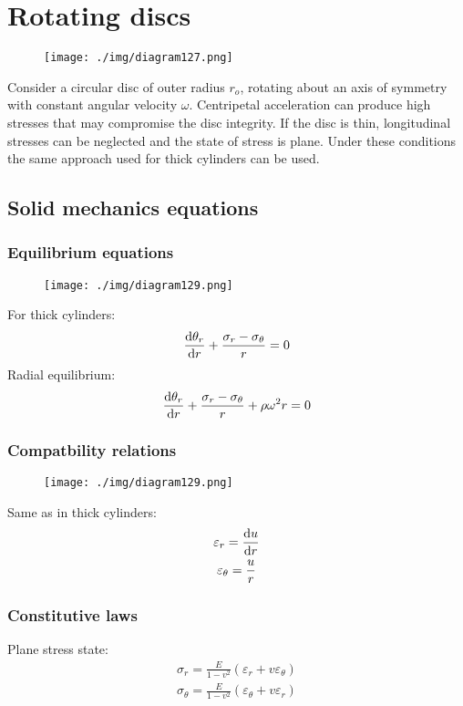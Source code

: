 \section{Rotating discs}
\begin{figure}[H]
    \centering
    \texttt{[image: ./img/diagram127.png]}
    \caption{}
\end{figure}
Consider a circular disc of outer radius $r_{o}$, rotating about an axis of symmetry with constant angular velocity $\omega$. Centripetal acceleration can produce high stresses that may compromise the disc integrity. If the disc is thin, longitudinal stresses can be neglected and the state of stress is plane. Under these conditions the same approach used for thick cylinders can be used.
\subsection{Solid mechanics equations}
\subsubsection{Equilibrium equations}
\begin{figure}[H]
    \centering
    \texttt{[image: ./img/diagram129.png]}
    \caption{}
\end{figure}
For thick cylinders:
\begin{equation}
    \frac{\dif \theta_r}{\dif r} + \frac{\sigma_r - \sigma_{\theta}}{r} =0
\end{equation}
Radial equilibrium:
\begin{equation}
    \frac{\dif \theta_r}{\dif r} + \frac{\sigma_r - \sigma_{\theta}}{r} + \rho \omega^2 r = 0
\end{equation}
\subsubsection{Compatbility relations}
\begin{figure}[H]
    \centering
    \texttt{[image: ./img/diagram129.png]}
    \caption{}
\end{figure}
Same as in thick cylinders:
\begin{gather}
    \varepsilon_r = \frac{\dif u}{\dif r}\\
    \varepsilon_{\theta} = \frac{u}{r}
\end{gather}
\subsubsection{Constitutive laws}
Plane stress state:
\begin{gather}
    \sigma_r = \frac{E}{1-v^2} \left(\varepsilon_r + v \varepsilon_{\theta}\right)\\
    \sigma_{\theta} = \frac{E}{1-v^2} \left(\varepsilon_{\theta} + v \varepsilon_{r}\right)
\end{gather}
